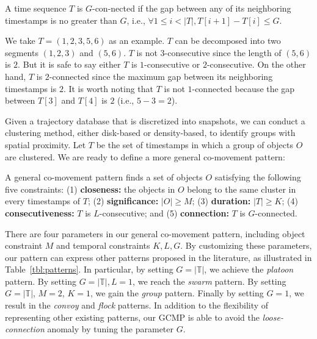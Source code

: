 \begin{definition}[$G$-connected]
A time sequence $T$ is $G$-con-nected if the gap between any of its neighboring timestamps is no greater than $G$, i.e., $\forall 1 \leq i < |T|, T[i+1]-T[i] \leq G$.
\end{definition}

We take $T=(1,2,3,5,6)$ as an example. $T$ can be decomposed into two segments $(1,2,3)$ and $(5,6)$. $T$ is not $3$-consecutive since the length of $(5,6)$ is $2$. But it is safe to say either $T$ is $1$-consecutive or $2$-consecutive. On the other hand, $T$ is $2$-connected since the maximum gap between its neighboring timestamps is $2$. It is worth noting that $T$ is not $1$-connected because the gap between $T[3]$ and $T[4]$ is $2$ (i.e., $5-3=2$).

Given a trajectory database that is discretized into snapshots, we can conduct a clustering method, either disk-based or density-based, to identify groups with spatial proximity. Let $T$ be the set of timestamps in which a group of objects $O$ are clustered. We are ready to define a more general co-movement pattern:
\begin{definition}
A general co-movement pattern finds a set of objects $O$ satisfying the following five constraints: (1) \textbf{closeness:} the objects in $O$ belong to the same cluster in every timestamps of $T$; (2) \textbf{significance:} $|O| \geq M$; (3) \textbf{duration:} $|T| \geq K$; (4) \textbf{consecutiveness:} $T$ is $L$-consecutive; and (5) \textbf{connection:} $T$ is $G$-connected.
\end{definition}
There are four parameters in our general co-movement pattern, including object constraint $M$ and temporal constraints $K,L,G$. 
By customizing these parameters, our pattern can 
express other patterns proposed in the literature, as illustrated in Table~\ref{tbl:patterns}. 
In particular, by setting $G=|\mathbb{T}|$, we achieve the \emph{platoon} pattern. By setting $G=|\mathbb{T}|,L=1$, we reach the \emph{swarm} pattern. By setting $G=|\mathbb{T}|$, $M=2$, $K=1$, we gain the \emph{group} pattern. Finally by setting $G=1$, we result in the \emph{convoy} and \emph{flock} patterns. 
In addition to the flexibility of representing other existing patterns, our GCMP is able to avoid the \emph{loose-connection} anomaly by tuning the parameter $G$. 

